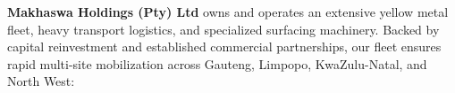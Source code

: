 \hypertarget{sec:plant}{}

\noindent
{\fontsize{9.0pt}{13pt}\selectfont\color{mhtext}
\textbf{Makhaswa Holdings (Pty) Ltd} owns and operates an extensive yellow metal fleet, heavy transport logistics, and specialized surfacing machinery. Backed by capital reinvestment and established commercial partnerships, our fleet ensures rapid multi-site mobilization across Gauteng, Limpopo, KwaZulu-Natal, and North West:
}

\vspace{0.20cm}

